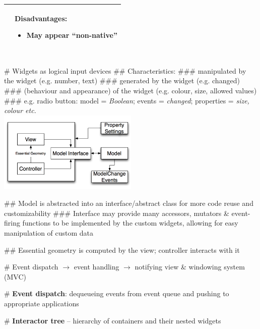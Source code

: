 \documentclass[11pt, oneside]{article}
\newcommand*{\un}[1]{\underline{\smash{#1}}}        %
\newenvironment{itemized}{\begin{itemize}[noitemsep, topsep=0pt, leftmargin=*]}{\end{itemize}}  %
\begin{document}
\begin{tabular}{|l|l|}
\begin{minipage}[t]{0.45\textwidth}
\begin{itemized}
    \end{itemized}
    \vspace*{0.5em}
\end{minipage}
&
\begin{minipage}[t]{0.45\textwidth}
Disadvantages:
    \begin{itemized}
        \item May appear ``non-native''
    \end{itemized}
    \vspace*{0.5em}
\end{minipage}  \\
\hline
\end{tabular} \\

# Widgets as logical input devices
## Characteristics:
### \un{Model} manipulated by the widget (e.g. number, text)
### \un{Events} generated by the widget (e.g. changed)
### \un{Properties} (behaviour and appearance) of the widget (e.g. colour, size, allowed values)
### e.g. radio button: model = \emph{Boolean}; events = \emph{changed}; properties = \emph{size, colour etc.} \\
\includegraphics[width=0.5\textwidth]{res/mvc_widget.png}

## Model is abstracted into an interface/abstract class for more code reuse and customizability
### Interface may provide many accessors, mutators \& event-firing functions to be implemented by the custom widgets, allowing for easy manipulation of custom data

## Essential geometry is computed by the view; controller interacts with it

# Event dispatch $\rightarrow$ event handling $\rightarrow$ notifying view \& windowing system (MVC)

# \textbf{Event dispatch}: dequeueing events from event queue and pushing to appropriate applications

# \textbf{Interactor tree} -- hierarchy of containers and their nested widgets
\end{document}
